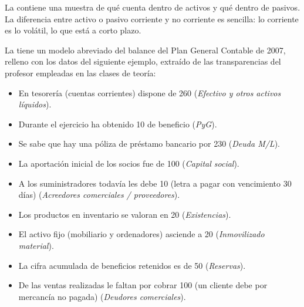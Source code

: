 \documentclass[nochap,palatino,shortheader]{apuntes}
\begin{document}
La  contiene una muestra de qué cuenta dentro de activos y qué dentro de pasivos. La diferencia entre activo o pasivo corriente y no corriente es sencilla: lo corriente es lo volátil, lo que está a corto plazo.

La  tiene un modelo abreviado del balance del Plan General Contable de 2007, relleno con los datos del siguiente ejemplo, extraído de las transparencias del profesor empleadas en las clases de teoría:

\begin{itemize}
\item En tesorería (cuentas corrientes) dispone de 260 (\textit{Efectivo y otros activos líquidos}).
\item Durante el ejercicio ha obtenido 10 de beneficio (\textit{PyG}).
\item Se sabe que hay una póliza de préstamo bancario por 230 (\textit{Deuda M/L}).
\item La aportación inicial de los socios fue de 100 (\textit{Capital social}).
\item A los suministradores todavía les debe 10 (letra a pagar con vencimiento 30 días) (\textit{Acreedores comerciales / proveedores}).
\item Los productos en inventario se valoran en 20 (\textit{Existencias}).
\item El activo fijo (mobiliario y ordenadores) asciende a 20 (\textit{Inmovilizado material}).
\item La cifra acumulada de beneficios retenidos es de 50 (\textit{Reservas}).
\item De las ventas realizadas le faltan por cobrar 100 (un cliente debe por mercancía no pagada) (\textit{Deudores comerciales}).
\end{itemize}
\end{document}
